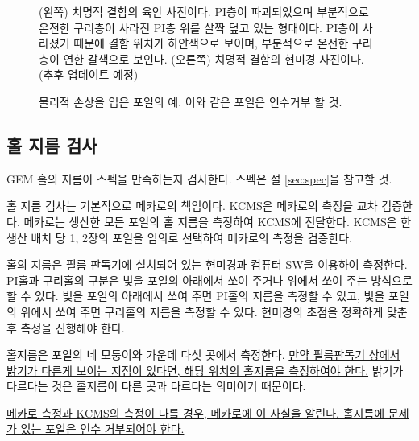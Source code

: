 \begin{figure}[htb]
  \centering
  \caption[치명적 식각 결함의 양상]{(왼쪽) 치명적 결함의 육안 사진이다. PI층이 파괴되었으며 부분적으로 온전한 구리층이 사라진 PI층 위를 살짝 덮고 있는 형태이다. PI층이 사라졌기 때문에 결함 위치가 하얀색으로 보이며, 부분적으로 온전한 구리층이 연한 갈색으로 보인다. (오른쪽) 치명적 결함의  현미경 사진이다. (추후 업데이트 예정)}
  \label{fig:defect_bad_zoom}
\end{figure} 

\begin{figure}[htb]
  \centering
  \caption[물리적 손상을 입은 포일의 예]{물리적 손상을 입은 포일의 예. 이와 같은 포일은 인수거부 할 것.}
  \label{fig:example_damaged_foils}
\end{figure}

\subsection{홀 지름 검사}
GEM 홀의 지름이 스펙을 만족하는지 검사한다. 스펙은 절 \ref{sec:spec}을 참고할 것.

홀 지름 검사는 기본적으로 메카로의 책임이다. KCMS은 메카로의 측정을 교차 검증한다. 메카로는 생산한 모든 포일의 홀 지름을 측정하여 KCMS에 전달한다. KCMS은 한 생산 배치 당 1, 2장의 포일을 임의로 선택하여 메카로의 측정을 검증한다.

홀의 지름은 필름 판독기에 설치되어 있는 현미경과 컴퓨터 SW을 이용하여 측정한다. PI홀과 구리홀의 구분은 빛을 포일의 아래에서 쏘여 주거나 위에서 쏘여 주는 방식으로 할 수 있다. 빛을 포일의 아래에서 쏘여 주면 PI홀의 지름을 측정할 수 있고, 빛을 포일의 위에서 쏘여 주면 구리홀의 지름을 측정할 수 있다. 현미경의 초점을 정확하게 맞춘 후 측정을 진행해야 한다.

홀지름은 포일의 네 모퉁이와 가운데 다섯 곳에서 측정한다. \uline{만약 필름판독기 상에서 밝기가 다른게 보이는 지점이 있다면, 해당 위치의 홀지름을 측정하여야 한다.} 밝기가 다르다는 것은 홀지름이 다른 곳과 다르다는 의미이기 때문이다. 

\uline{메카로 측정과 KCMS의 측정이 다를 경우, 메카로에 이 사실을 알린다. 홀지름에 문제가 있는 포일은 인수 거부되어야 한다.}

